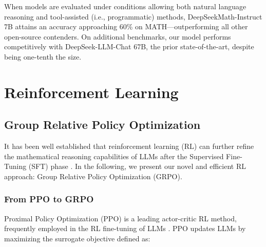 When models are evaluated under conditions allowing both natural language reasoning and tool-assisted (i.e., programmatic) methods, DeepSeekMath-Instruct 7B attains an accuracy approaching 60\% on MATH—outperforming all other open-source contenders. On additional benchmarks, our model performs competitively with DeepSeek-LLM-Chat 67B, the prior state-of-the-art, despite being one-tenth the size.

\section{Reinforcement Learning}

\subsection{Group Relative Policy Optimization} It has been well established that reinforcement learning (RL) can further refine the mathematical reasoning capabilities of LLMs after the Supervised Fine-Tuning (SFT) phase \citep{wang2023math,wizardmath}. In the following, we present our novel and efficient RL approach: Group Relative Policy Optimization (GRPO).

\subsubsection{From PPO to GRPO} Proximal Policy Optimization (PPO) \citep{schulman2017proximal} is a leading actor-critic RL method, frequently employed in the RL fine-tuning of LLMs \citep{ouyang2022training}. PPO updates LLMs by maximizing the surrogate objective defined as:

